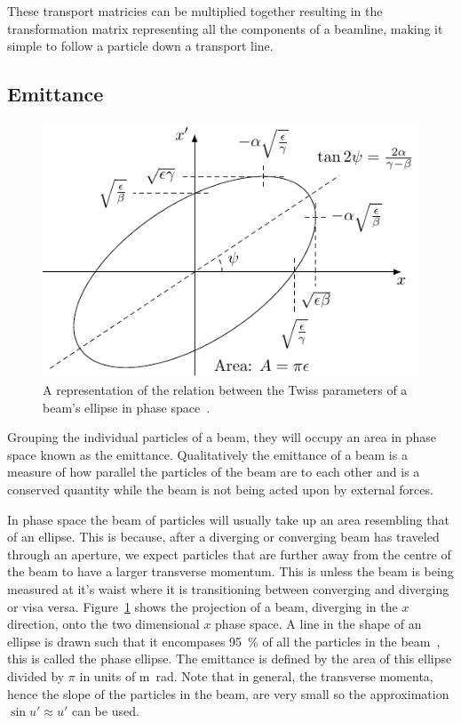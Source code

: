 These transport matricies can be multiplied together resulting in the
transformation matrix representing all the components of a beamline, making it
simple to follow a particle down a transport line.

\subsection{Emittance}
\label{sec:emittance}

\begin{figure}
	\centering
	\includegraphics{figures/ellipse}
	\caption{
		A representation of the relation between the Twiss parameters of
		a beam's ellipse in phase space~\cite{wiedemann2007particle}.}
	\label{fig:ellipse}
\end{figure}

Grouping the individual particles of a beam, they will occupy an area in phase
space known as the emittance.  Qualitatively the emittance of a beam is a
measure of how parallel the particles of the beam are to each other and is a
conserved quantity while the beam is not being acted upon by external forces.

In phase space the beam of particles will usually take up an area resembling
that of an ellipse. This is because, after a diverging or converging beam has
traveled through an aperture, we expect particles that are further away from the
centre of the beam to have a larger transverse momentum. This is unless the beam
is being measured at it's waist where it is transitioning between converging and
diverging or visa versa. Figure~\ref{fig:ellipse} shows the projection of a
beam, diverging in the \(x\) direction, onto the two dimensional \(x\) phase
space.  A line in the shape of an ellipse is drawn such that it encompases
\SI{95}{\percent} of all the particles in the beam~\cite{buon1994beam}, this is
called the phase ellipse.  The emittance is defined by the area of this ellipse
divided by \(\pi\) in units of \si{\meter\radian}. Note that in general, the
transverse momenta, hence the slope of the particles in the beam, are very small
so the approximation \(\sin u'\approx u'\) can be used.

